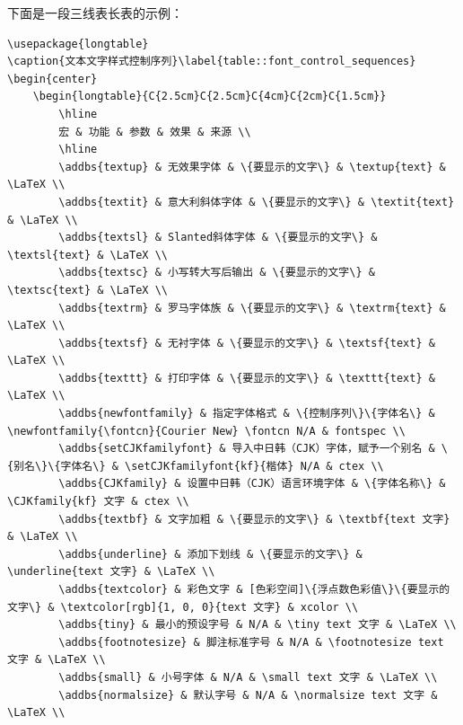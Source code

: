 下面是一段三线表长表的示例：
\begin{lstlisting}[style = LaTeX_TeXworks]
\usepackage{longtable}
\caption{文本文字样式控制序列}\label{table::font_control_sequences}
\begin{center}
	\begin{longtable}{C{2.5cm}C{2.5cm}C{4cm}C{2cm}C{1.5cm}}
		\hline
		宏 & 功能 & 参数 & 效果 & 来源 \\
		\hline
		\addbs{textup} & 无效果字体 & \{要显示的文字\} & \textup{text} & \LaTeX \\
		\addbs{textit} & 意大利斜体字体 & \{要显示的文字\} & \textit{text} & \LaTeX \\
		\addbs{textsl} & Slanted斜体字体 & \{要显示的文字\} & \textsl{text} & \LaTeX \\
		\addbs{textsc} & 小写转大写后输出 & \{要显示的文字\} & \textsc{text} & \LaTeX \\
		\addbs{textrm} & 罗马字体族 & \{要显示的文字\} & \textrm{text} & \LaTeX \\
		\addbs{textsf} & 无衬字体 & \{要显示的文字\} & \textsf{text} & \LaTeX \\
		\addbs{texttt} & 打印字体 & \{要显示的文字\} & \texttt{text} & \LaTeX \\
		\addbs{newfontfamily} & 指定字体格式 & \{控制序列\}\{字体名\} & \newfontfamily{\fontcn}{Courier New} \fontcn N/A & fontspec \\
		\addbs{setCJKfamilyfont} & 导入中日韩（CJK）字体，赋予一个别名 & \{别名\}\{字体名\} & \setCJKfamilyfont{kf}{楷体} N/A & ctex \\
		\addbs{CJKfamily} & 设置中日韩（CJK）语言环境字体 & \{字体名称\} & \CJKfamily{kf} 文字 & ctex \\
		\addbs{textbf} & 文字加粗 & \{要显示的文字\} & \textbf{text 文字} & \LaTeX \\
		\addbs{underline} & 添加下划线 & \{要显示的文字\} & \underline{text 文字} & \LaTeX \\
		\addbs{textcolor} & 彩色文字 & [色彩空间]\{浮点数色彩值\}\{要显示的文字\} & \textcolor[rgb]{1, 0, 0}{text 文字} & xcolor \\
		\addbs{tiny} & 最小的预设字号 & N/A & \tiny text 文字 & \LaTeX \\
		\addbs{footnotesize} & 脚注标准字号 & N/A & \footnotesize text 文字 & \LaTeX \\
		\addbs{small} & 小号字体 & N/A & \small text 文字 & \LaTeX \\
		\addbs{normalsize} & 默认字号 & N/A & \normalsize text 文字 & \LaTeX \\

\end{lstlisting}

